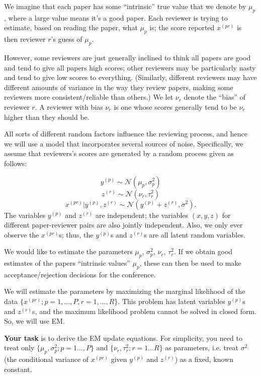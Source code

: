 \documentclass[12pt]{article}
\begin{document}
We imagine that each paper has some ``intrinsic'' true value that we denote by $\mu_p$, where a large value means it's a good paper. Each reviewer is trying to estimate, based on reading the paper, what $\mu_p$ is; the score reported $x^{(pr)}$ is then reviewer $r$'s guess of $\mu_p$.

However, some reviewers are just generally inclined to think all papers are good and tend to give all papers high scores; other reviewers may be particularly nasty and tend to give low scores to everything. (Similarly, different reviewers may have different amounts of variance in the way they review papers, making some reviewers more consistent/reliable than others.) We let $\nu_r$ denote the ``bias'' of reviewer $r$. A reviewer with bias $\nu_r$ is one whose scores generally tend to be $\nu_r$ higher than they should be.

All sorts of different random factors influence the reviewing process, and hence we will use a model that incorporates several sources of noise. Specifically, we assume that reviewers's scores are generated by a random process given as follows:

\[
y^{(p)} \sim \mathcal{N}(\mu_p, \sigma_p^2)
\]
\[
z^{(r)} \sim \mathcal{N}(\nu_r, \tau_r^2)
\]
\[
x^{(pr)}|y^{(p)}, z^{(r)} \sim\mathcal{N}(y^{(p)}+ z^{(r)}, \sigma^2).
\]
The variables $y^{(p)}$ and $z^{(r)}$ are independent; the variables $(x,y,z)$ for different paper-reviewer pairs are also jointly independent. Also, we only ever observe the $x^{(pr)}$s; thus, the $y^{(p)}$s and $z^{(r)}$s are all latent random variables.
 
We would like to estimate the parameters $\mu_p$, $\sigma_p^2$, $\nu_r$, $\tau_r^2$. If we obtain good estimates of the papers ``intrinsic values'' $\mu_p$, these can then be used to make acceptance/rejection decisions for the conference. 

We will estimate the parameters by maximizing the marginal likelihood of the data $\{x^{(pr)}; p = 1,\ldots,P,r = 1,\ldots,R\}$. This problem has latent variables $y^{(p)}$s and $z^{(r)}$s, and the maximum likelihood problem cannot be solved in closed form. So, we will use EM. 

{\bf Your task} is to derive the EM update equations. For simplicity, you need to treat only $\{\mu_p,\sigma_p^2; p = 1\ldots,P\}$ and $\{\nu_r,\tau_r^2;r = 1...R\}$ as parameters, i.e. treat $\sigma^2$ (the conditional variance of $x^{(pr)}$ given $y^{(p)}$ and $z^{(r)}$) as a fixed, known constant.
\end{document}
